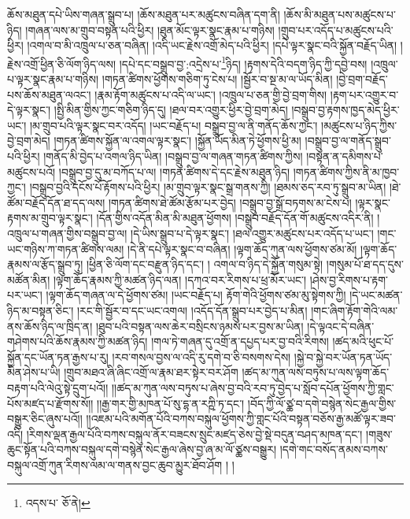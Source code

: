 ཆོས་མཐུན་དཔེ་ཡིས་གཞན་སྒྲུབ་པ། །ཆོས་མཐུན་པར་མཚུངས་བཞིན་དག་ནི། །ཆོས་མི་མཐུན་པས་མཚུངས་པ་ཉིད། །གཞན་ལས་མ་གྲུབ་བསྟན་པའི་ཕྱིར། །ཐུན་མོང་ལྟར་སྣང་རྣམ་པ་གཉིས། །གྲུབ་པར་འདོད་པ་མཚུངས་པའི་ཕྱིར། །འགལ་བ་མི་འཁྲུལ་པ་ཅན་བཞིན། །འདི་ཡང་རྗེས་འགྲོ་མེད་པའི་ཕྱིར། །དཔེ་ལྟར་སྣང་བའི་སྐྱོན་བརྗོད་ཡིན། །རྗེས་འགྲོ་ཕྱིན་ཅི་ལོག་ཉིད་ལས། །དཔེ་དང་བསྒྲུབ་བྱ་:འདྲེས་པ་\footnote{འདས་པ་  ཅོ་ནེ། }ཉིད། །རྟགས་དེའི་བདག་ཉིད་ཀྱི་དབྱེ་བས། །འཁྲུལ་པ་ལྟར་སྣང་རྣམ་པ་གཉིས། །གཏན་ཚིགས་ཕྱོགས་གཅིག་ཏུ་ངེས་པ། །སྦྱོར་བ་སྔ་མ་ལ་ཡོད་མིན། །བྱེ་བྲག་བརྗོད་པས་ཆོས་མཐུན་ལའང་། །རྣམ་རྟོག་མཚུངས་པ་འདི་ལ་ཡང་། །འཁྲུལ་པ་ཅན་གྱི་བྱེ་བྲག་གིས། །རྟག་པར་འགྱུར་བ་དེ་ལྟར་སྣང་། །སྤྱི་མིན་གྱིས་ཀྱང་གཅིག་ཉིད་དུ། །ཐལ་བར་འགྱུར་ཕྱིར་བྱེ་བྲག་མེད། །བསྒྲུབ་བྱ་རྟགས་ཁྱད་མེད་ཕྱིར་ཡང་། །མ་གྲུབ་པའི་ལྟར་སྣང་བར་འདོད། །ཡང་བརྗོད་པ། བསྒྲུབ་བྱ་ལ་ནི་གནོད་ཆོས་ཀྱང་། །མཚུངས་པ་ཉིད་ཀྱིས་བྱེ་བྲག་མེད། །གཏན་ཚིགས་སྐྱོན་ལ་འགལ་ལྟར་སྣང་། །སྐྱོན་ཡོད་མིན་ཏེ་ཕྱོགས་ཕྱི་མ། །བསྒྲུབ་བྱ་ལ་གནོད་སྒྲུབ་པའི་ཕྱིར། །གནོད་མི་བྱེད་པ་འགལ་ཉིད་ཡིན། །བསྒྲུབ་བྱ་ལ་གཞན་གཏན་ཚིགས་ཀྱིས། །བསྟན་ན་དམིགས་པ་མཚུངས་པའོ། །བསྒྲུབ་བྱ་དུ་མ་བཀོད་པ་ལ། །གཏན་ཚིགས་དེ་དང་རྗེས་མཐུན་ཉིད། །གཏན་ཚིགས་ཀྱིས་ནི་མ་ཁྱབ་ཀྱང་། །བསྒྲུབ་བྱའི་དངོས་པོ་རྟོགས་པའི་ཕྱིར། །མ་གྲུབ་ལྟར་སྣང་སྒྲ་གནས་ཀྱི། །ཐམས་ཅད་རབ་ཏུ་སྒྲུབ་མ་ཡིན། །ཐེ་ཚོམ་བརྗོད་དོན་ཐ་དད་ལས། །གཏན་ཚིགས་ཐེ་ཚོམ་རྩོམ་པར་བྱེད། །བསྒྲུབ་བྱ་སྒྲོ་བཏགས་མ་ངེས་པ། །ལྟར་སྣང་རྟགས་མ་གྲུབ་ལྟར་སྣང་། །དོན་གྱིས་འདོན་མིན་མི་མཐུན་ཕྱོགས། །བསྒྲུབ་བརྗོད་དོན་གོ་མཚུངས་འདིར་ནི། །འཁྲུལ་པ་གཞན་གྱིས་བསྒྲུབ་བྱ་ལ། །དེ་ཡིས་སྒྲུབ་པ་དེ་ལྟར་སྣང་། །ཐལ་འགྱུར་མཚུངས་པར་འདོད་པ་ཡང་། །གང་ཡང་གཉིས་ཀ་གཏན་ཚིགས་ལམ། །དེ་ནི་དཔེ་ལྟར་སྣང་བ་བཞིན། །ལྟག་ཆོད་ཀུན་ལས་ཕྱོགས་ཙམ་མོ། །ལྟག་ཆོད་རྣམས་ལ་རྩོད་སྒྲུབ་ཏུ། །ཕྱིན་ཅི་ལོག་དང་བརྫུན་ཉིད་དང་། །
འགལ་བ་ཉིད་དེ་སྐྱོན་གསུམ་སྟེ། །གསུམ་པོ་ཐ་དད་དུས་མཚོན་མིན། །ལྟག་ཆོད་རྣམས་ཀྱི་མཚན་ཉིད་ལན། །དཀའ་བར་རིགས་པ་ཕྲ་མོར་ཡང་། །ཤེས་བྱ་རིགས་པ་རྟག་པར་ཡང་། །ལྟག་ཆོད་གཞན་ལ་དེ་ཕྱོགས་ཙམ། །ཡང་བརྗོད་པ། རྟོག་གེའི་ཕྱོགས་ཙམ་མུ་སྟེགས་ཀྱི། །དེ་ཡང་མཚན་ཉིད་མ་བསྟན་ཅིང་། །རང་གི་སྦྱོར་བ་དང་ཡང་འགལ། །འདོད་དོན་སྒྲུབ་པར་བྱེད་པ་མིན། །གང་ཞིག་རྟོག་གེའི་ལམ་ནས་ཆོས་ཉིད་ལ་ཁྲིད་ན། །ཐུབ་པའི་བསྟན་ལས་ཆེར་བསྲིངས་ཉམས་པར་བྱས་མ་ཡིན། །དེ་ལྟའང་དེ་བཞིན་གཤེགས་པའི་ཆོས་རྣམས་ཀྱི་མཚན་ཉིད། །གལ་ཏེ་གཞན་དུ་འགྲོ་ན་དཔྱད་པར་བྱ་བའི་རིགས། །ཚད་མའི་ཕུང་པོ་སྐྱོན་དང་ཡོན་ཏན་རྒྱས་པ་རུ། །རབ་གསལ་བྱས་ལ་འདི་རུ་དགེ་བ་ཅི་བསགས་དེས། །སྐྱེ་བ་སྐྱེ་བར་ཡོན་ཏན་ཡོད་མིན་ཤེས་པ་ཡི། །གྲུབ་མཐའ་ཞི་ཞིང་འགྲོ་ལ་རྣམ་ཐར་སྟེར་བར་ཤོག །ཚད་མ་ཀུན་ལས་བཏུས་པ་ལས་ལྟག་ཆོད་བརྟག་པའི་ལེའུ་སྟེ་དྲུག་པའོ།། །།ཚད་མ་ཀུན་ལས་བཏུས་པ་ཞེས་བྱ་བའི་རབ་ཏུ་བྱེད་པ་སློབ་དཔོན་ཕྱོགས་ཀྱི་གླང་པོས་མཛད་པ་རྫོགས་སོ།། །།རྒྱ་གར་གྱི་མཁན་པོ་སུ་དྷ་ན་རཀྵི་ཏ་དང་། །བོད་ཀྱི་ལོ་ཙྪ་བ་དགེ་བསྙེན་སེང་རྒྱལ་གྱིས་བསྒྱུར་ཅིང་ཞུས་པའོ།། །།འཇམ་པའི་མགོན་པོའི་བཀས་བསྐུལ་ཕྱོགས་ཀྱི་གླང་པོའི་བསྟན་བཅོས་རྒྱ་མཚོ་ལྟར་ཟབ་འདི། །རིགས་ལྡན་རྒྱལ་པོའི་བཀས་བསྐུལ་ནོར་བཟངས་སྲུང་མཛད་ཅེས་བྱེ་སྡེ་བདུན་བཤད་མཁན་དང་། །གཟུས་ཆུང་སྟོན་པའི་བཀས་བསྐུལ་དགེ་བསྙེན་སེང་རྒྱལ་ཞེས་བྱ་ཞ་མ་ལོ་ཙྪས་བསྒྱུར། །དགེ་གང་བསོད་ནམས་བཀས་བསྐུལ་འགྲོ་ཀུན་རིགས་ལམ་ལ་གནས་བྱང་ཆུབ་མྱུར་ཐོབ་ཤོག ། །